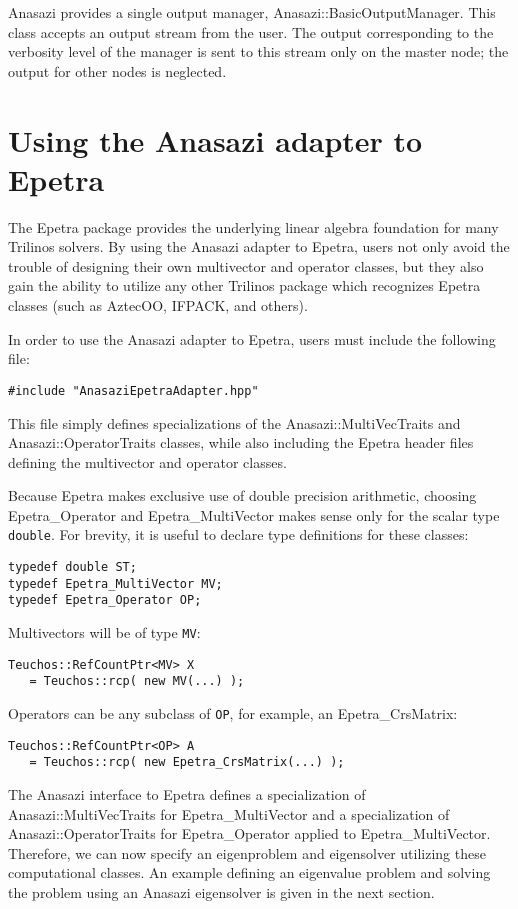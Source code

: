 Anasazi provides a single output manager, Anasazi::BasicOutputManager. This class accepts
an output stream from the user. The output corresponding to the verbosity level of the
manager is sent to this stream only on the master node; the output for other nodes is
neglected.

\section{Using the Anasazi adapter to Epetra}
\label{sec:anasazi:epetra}

The Epetra package provides the underlying linear algebra foundation for many
Trilinos solvers.  By using the Anasazi adapter to Epetra, users not only
avoid the trouble of designing their own multivector and operator classes, but
they also gain the ability to utilize any other Trilinos package which
recognizes Epetra classes (such as AztecOO, IFPACK, and others).

In order to use the Anasazi adapter to Epetra, users must include the following
file:
\begin{verbatim}
#include "AnasaziEpetraAdapter.hpp"
\end{verbatim}
This file simply defines specializations of the Anasazi::MultiVecTraits
and Anasazi::OperatorTraits classes, while also including the Epetra
header files defining the multivector and operator classes.

Because Epetra makes exclusive use of double precision arithmetic, choosing
Epetra\_Operator and Epetra\_MultiVector makes sense only for the
scalar type \verb!double!. For brevity, it is useful to declare type definitions
for these classes:
\begin{verbatim}
typedef double ST;
typedef Epetra_MultiVector MV;
typedef Epetra_Operator OP;
\end{verbatim}

\noindent Multivectors will be of type \verb!MV!:
\begin{verbatim}
Teuchos::RefCountPtr<MV> X 
   = Teuchos::rcp( new MV(...) );
\end{verbatim}

\noindent Operators can be any subclass of \verb!OP!, for example, an Epetra\_CrsMatrix:
\begin{verbatim}
Teuchos::RefCountPtr<OP> A 
   = Teuchos::rcp( new Epetra_CrsMatrix(...) );
\end{verbatim}

The Anasazi interface to Epetra defines a specialization of
Anasazi::MultiVecTraits for Epetra\_MultiVector and a
specialization of Anasazi::OperatorTraits for Epetra\_Operator
applied to Epetra\_MultiVector. Therefore, we can now specify an
eigenproblem and eigensolver utilizing these computational classes. An example
defining an eigenvalue problem and solving the problem using an Anasazi
eigensolver is given in the next section.



